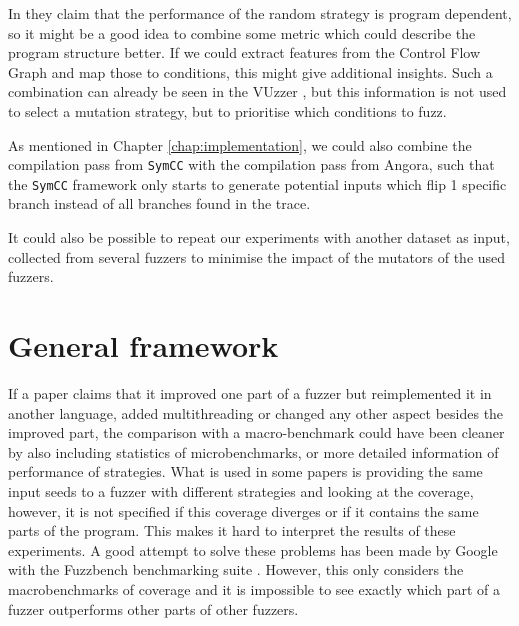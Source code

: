 In \cite{lyu2019mopt} they claim that the performance of the random strategy is program dependent, so it might be a good idea to combine some metric which could describe the program structure better. If we could extract features from the Control Flow Graph and map those to conditions, this might give additional insights. Such a combination can already be seen in the VUzzer \cite{rawat2017vuzzer}, but this information is not used to select a mutation strategy, but to prioritise which conditions to fuzz.

As mentioned in Chapter \ref{chap:implementation}, we could also combine the compilation pass from \texttt{SymCC} with the compilation pass from Angora, such that the \texttt{SymCC} framework only starts to generate potential inputs which flip 1 specific branch instead of all branches found in the trace.

It could also be possible to repeat our experiments with another dataset as input, collected from several fuzzers to minimise the impact of the mutators of the used fuzzers.

\section{General framework}
If a paper claims that it improved one part of a fuzzer but reimplemented it in another language, added multithreading or changed any other aspect besides the improved part, the comparison with a macro-benchmark could have been cleaner by also including statistics of microbenchmarks, or more detailed information of performance of strategies. What is used in some papers is providing the same input seeds to a fuzzer with different strategies and looking at the coverage, however, it is not specified if this coverage diverges or if it contains the same parts of the program. This makes it hard to interpret the results of these experiments. A good attempt to solve these problems has been made by Google with the Fuzzbench benchmarking suite \cite{metzman2020fuzzbench}. However, this only considers the macrobenchmarks of coverage and it is impossible to see exactly which part of a fuzzer outperforms other parts of other fuzzers.

